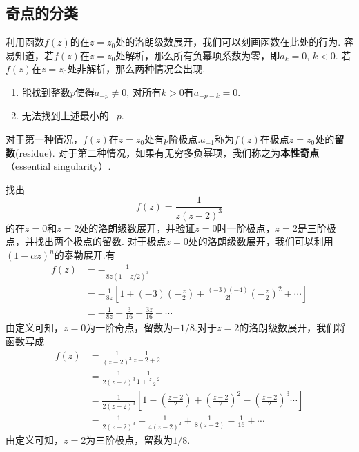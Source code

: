 \subsection{奇点的分类}
\label{subsec:singular_points}
利用函数$f(z)$的在$z=z_0$处的洛朗级数展开，我们可以刻画函数在此处的行为.
容易知道，若$f(z)$在$z=z_0$处解析，那么所有负幂项系数为零，即$a_k = 0$, $k<0$.
若$f(z)$在$z=z_0$处非解析，那么两种情况会出现.
\begin{enumerate}
    \item 能找到整数$p$使得$a_{-p} \neq 0$, 对所有$k>0$有$a_{-p - k}=0$.
    \item 无法找到上述最小的$-p$.
\end{enumerate}
对于第一种情况，$f(z)$在$z=z_0$处有$p$阶极点.$a_{-1}$称为$f(z)$在极点$z=z_0$处的\textbf{留数}(residue).
对于第二种情况，如果有无穷多负幂项，我们称之为\textbf{本性奇点}（essential singularity）.

\begin{examplebox}{找出\[f(z) = \frac{1}{z( z- 2)^3}\]
    的在$z=0$和$z=2$处的洛朗级数展开，并验证$z=0$时一阶极点，$z=2$是三阶极点，并找出两个极点的留数.}
对于极点$z=0$处的洛朗级数展开，我们可以利用$(1-\alpha z)^n$的泰勒展开.有
\[
    \begin{aligned}
    f(z) &= -\frac{1}{8z(1-z/2)^3}
    \\
     &= -\frac{1}{8z}\left[ 1 + (-3) (-\frac{z}{2}) + \frac{(-3)(-4)}{2!} \left( -\frac{z}{2}\right)^2 + \cdots \right] 
    \\
     &= -\frac{1}{8z} - \frac{3}{16} - \frac{3z}{16} + \cdots   
    \end{aligned}
\]
由定义可知，$z=0$为一阶奇点，留数为$-1/8$.对于$z=2$的洛朗级数展开，我们将函数写成
\[
    \begin{aligned}
        f(z) &= \frac{1}{(z-2)^3} \frac{1}{z-2 + 2}
        \\
        &= \frac{1}{2(z-2)^3} \frac{1}{1+\frac{z-2}{2}}
        \\
        &= \frac{1}{2(z-2)^3} \left[ 1 - \left(\frac{z-2}{2} \right) + \left(\frac{z-2}{2}\right)^2 - \left(\frac{z-2}{2}\right)^3 \cdots \right] 
        \\
        &= \frac{1}{2(z-2)^3} - \frac{1}{4(z-2)^2} + \frac{1}{8(z-2)} - \frac{1}{16} + \cdots
    \end{aligned}
\]
由定义可知，$z=2$为三阶极点，留数为$1/8$.
\end{examplebox}

